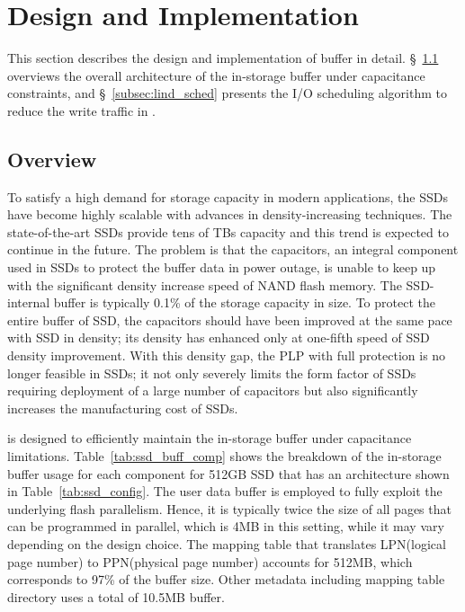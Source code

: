 \section{Design and Implementation}
\iffalse
This section describes the design and implementation of \ours{} buffer in detail. 
\S~\ref{subsec:overview} overviews the overall architecture of the in-storage buffer under capacitance constraints, and \S~\ref{subsec:lind_sched} presents the I/O scheduling algorithm
to reduce the write traffic in \ours{}.

\subsection{Overview}
\label{subsec:overview}
To satisfy a high demand for storage capacity in modern applications,
the SSDs have become highly scalable with advances in density-increasing techniques. 
The state-of-the-art SSDs provide tens of TBs capacity and this trend is expected 
to continue in the future.
The problem is that the capacitors, an integral component used in SSDs to protect the buffer data
in power outage, is unable to keep up with the significant density increase speed of NAND flash memory. 
The SSD-internal buffer is typically 0.1\% of the storage capacity in size.
To protect the entire buffer of SSD, the capacitors 
should have been improved at the same pace with SSD in density; 
its density has enhanced only at one-fifth speed of SSD density improvement. 
With this density gap, the PLP with full protection is no longer feasible in SSDs; 
it not only severely limits the form factor of SSDs requiring deployment of a large number of capacitors but also significantly increases the manufacturing cost of SSDs. 

\ours{} is designed to efficiently maintain the in-storage buffer under capacitance limitations. 
Table~\ref{tab:ssd_buff_comp} shows the breakdown of the in-storage buffer usage for each component
for 512GB SSD that has an architecture shown in Table~\ref{tab:ssd_config}. 
The user data buffer is employed to fully exploit the underlying flash parallelism.
Hence, it is typically twice the size of all pages that can be programmed in parallel, 
which is 4MB in this setting, while it may vary depending on the design choice. 
The mapping table that translates LPN(logical page number) to PPN(physical page number) 
accounts for 512MB, which corresponds to 97\% of the buffer size. 
Other metadata including mapping table directory uses a total of 10.5MB buffer. 

